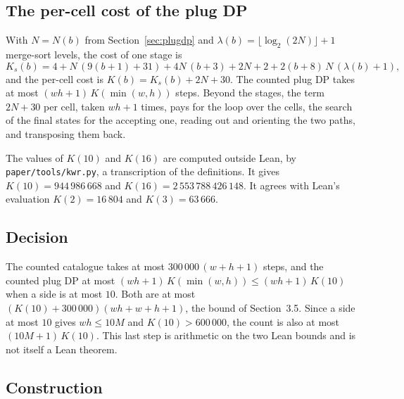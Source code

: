 \documentclass[11pt]{article}
\newcommand{\lean}[1]{\texttt{#1}}
\begin{document}
\subsection{The per-cell cost of the plug DP}

With $N=N(b)$ from Section~\ref{sec:plugdp} and $\lambda(b)=\lfloor\log_2(2N)\rfloor+1$ merge-sort
levels, the cost of one stage is
\[
K_s(b) = 4 + N\,(9(b+1)+31) + 4N\,(b+3) + 2N + 2 + 2(b+8)\,N\,(\lambda(b)+1),
\]
and the per-cell cost is $K(b)=K_s(b)+2N+30$. The counted plug DP takes at most
$(wh+1)\,K(\min(w,h))$ steps. Beyond the stages, the term $2N+30$ per cell, taken $wh+1$ times,
pays for the loop over the cells, the search of the final states for the accepting one, reading
out and orienting the two paths, and transposing them back.

The values of $K(10)$ and $K(16)$ are computed outside Lean, by \lean{paper/tools/kwr.py}, a
transcription of the definitions. It gives $K(10)=944\,986\,668$ and
$K(16)=2\,553\,788\,426\,148$. It agrees with Lean's evaluation $K(2)=16\,804$ and
$K(3)=63\,666$.

\subsection{Decision}

The counted catalogue takes at most $300\,000\,(w+h+1)$ steps, and the counted plug DP at most
$(wh+1)\,K(\min(w,h))\le(wh+1)\,K(10)$ when a side is at most $10$. Both are at most
$(K(10)+300\,000)(wh+w+h+1)$, the bound of Section~3.5. Since a side at most $10$ gives $wh\le 10M$
and $K(10)>600\,000$, the count is also at most $(10M+1)\,K(10)$. This last step is arithmetic on
the two Lean bounds and is not itself a Lean theorem.

\subsection{Construction}
\end{document}
